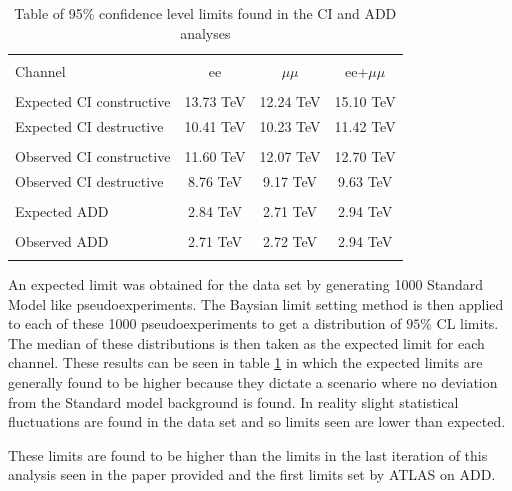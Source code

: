 	\begin{table}[h!]
	\centering %
	\begin{tabular}{l ccc} %
	\hline\hline \\[-2ex] %
	Channel & ee & $\mu\mu$ & ee+$\mu\mu$\\  [0.2ex]
	\hline  \\[-2ex] %
	Expected CI constructive & 13.73 TeV & 12.24 TeV & 15.10 TeV\\ 
	Expected CI destructive & 10.41 TeV & 10.23 TeV & 11.42 TeV \\ 
	\hline  \\[-2ex] %
	Observed CI constructive & 11.60 TeV & 12.07 TeV & 12.70 TeV \\ 
	Observed CI destructive & 8.76 TeV & 9.17 TeV & 9.63 TeV \\ 
	\hline\hline  \\[-2ex] %
	Expected ADD & 2.84 TeV & 2.71 TeV & 2.94 TeV \\ 
	\hline  \\[-2ex] %
	Observed ADD & 2.71 TeV & 2.72 TeV & 2.94 TeV \\ 
	\hline\hline  \\ %
	\end{tabular}
	\caption{Table of 95\% confidence level limits found in the CI and ADD analyses} %
	\label{tab:CILimits}
	\end{table}

	An expected limit was obtained for the data set by generating 1000 Standard Model like pseudoexperiments. The Baysian limit setting method is then applied to each of these 1000 pseudoexperiments to get a distribution of $95\%$ CL limits. The median of these distributions is then taken as the expected limit for each channel. These results can be seen in table \ref{tab:CILimits} in which the expected limits are generally found to be higher because they dictate a scenario where no deviation from the Standard model background is found. In reality slight statistical fluctuations are found in the data set and so limits seen are lower than expected. 

	These limits are found to be higher than the limits in the last iteration of this analysis seen in the paper provided and the first limits set by ATLAS on ADD.




